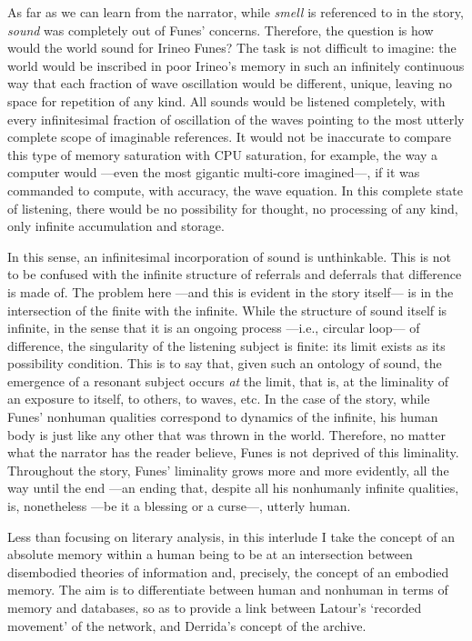 As far as we can learn from the narrator, while \textit{smell} is referenced to in the story, \textit{sound} was completely out of Funes' concerns. Therefore, the question is how would the world sound for Irineo Funes? The task is not difficult to imagine: the world would be inscribed in poor Irineo's memory in such an infinitely continuous way that each fraction of wave oscillation would be different, unique, leaving no space for repetition of any kind. All sounds would be listened completely, with every infinitesimal fraction of oscillation of the waves pointing to the most utterly complete scope of imaginable references. It would not be inaccurate to compare this type of memory saturation with CPU saturation, for example, the way a computer would ---even the most gigantic multi-core imagined---, if it was commanded to compute, with accuracy, the wave equation. In this complete state of listening, there would be no possibility for thought, no processing of any kind, only infinite accumulation and storage.

In this sense, an infinitesimal incorporation of sound is unthinkable. This is not to be confused with the infinite structure of referrals and deferrals that difference is made of. The problem here ---and this is evident in the story itself--- is in the intersection of the finite with the infinite. While the structure of sound itself is infinite, in the sense that it is an ongoing process ---i.e., circular loop--- of difference, the singularity of the listening subject is finite: its limit exists as its possibility condition. This is to say that, given such an ontology of sound, the emergence of a resonant subject occurs \textit{at} the limit, that is, at the liminality of an exposure to itself, to others, to waves, etc. In the case of the story, while Funes' nonhuman qualities correspond to dynamics of the infinite, his human body is just like any other that was thrown in the world. Therefore, no matter what the narrator has the reader believe, Funes is not deprived of this liminality. Throughout the story, Funes' liminality grows more and more evidently, all the way until the end ---an ending that, despite all his nonhumanly infinite qualities, is, nonetheless ---be it a blessing or a curse---, utterly human.

Less than focusing on literary analysis, in this interlude I take the concept of an absolute memory within a human being to be at an intersection between disembodied theories of information and, precisely, the concept of an embodied memory. The aim is to differentiate between human and nonhuman in terms of memory and databases, so as to provide a link between Latour's `recorded movement' of the network, and Derrida's concept of the archive. 
